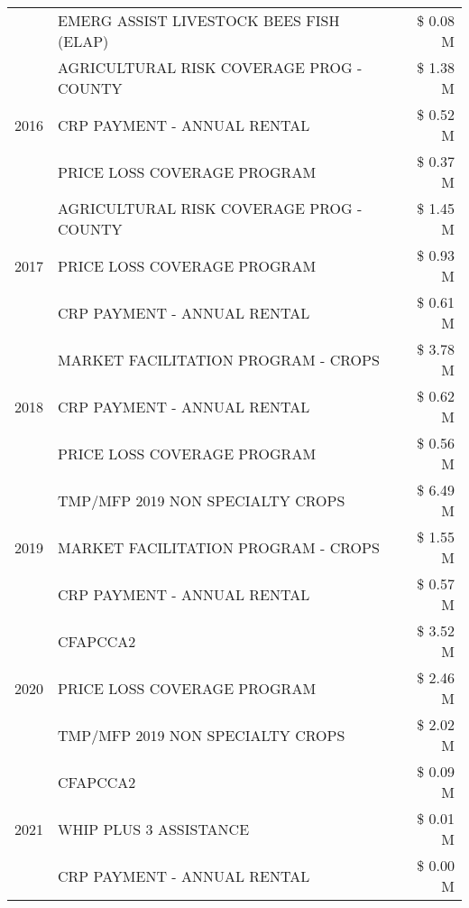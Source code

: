 \begin{tabular}{llr}
 & EMERG ASSIST LIVESTOCK BEES FISH (ELAP) & \$ 0.08 M \\
\cline{1-3}
\multirow[t]{3}{*}{2016} & AGRICULTURAL RISK COVERAGE PROG - COUNTY & \$ 1.38 M \\
 & CRP PAYMENT - ANNUAL RENTAL & \$ 0.52 M \\
 & PRICE LOSS COVERAGE PROGRAM & \$ 0.37 M \\
\cline{1-3}
\multirow[t]{3}{*}{2017} & AGRICULTURAL RISK COVERAGE PROG - COUNTY & \$ 1.45 M \\
 & PRICE LOSS COVERAGE PROGRAM & \$ 0.93 M \\
 & CRP PAYMENT - ANNUAL RENTAL & \$ 0.61 M \\
\cline{1-3}
\multirow[t]{3}{*}{2018} & MARKET FACILITATION PROGRAM - CROPS & \$ 3.78 M \\
 & CRP PAYMENT - ANNUAL RENTAL & \$ 0.62 M \\
 & PRICE LOSS COVERAGE PROGRAM & \$ 0.56 M \\
\cline{1-3}
\multirow[t]{3}{*}{2019} & TMP/MFP 2019 NON SPECIALTY CROPS & \$ 6.49 M \\
 & MARKET FACILITATION PROGRAM - CROPS & \$ 1.55 M \\
 & CRP PAYMENT - ANNUAL RENTAL & \$ 0.57 M \\
\cline{1-3}
\multirow[t]{3}{*}{2020} & CFAPCCA2 & \$ 3.52 M \\
 & PRICE LOSS COVERAGE PROGRAM & \$ 2.46 M \\
 & TMP/MFP 2019 NON SPECIALTY CROPS & \$ 2.02 M \\
\cline{1-3}
\multirow[t]{3}{*}{2021} & CFAPCCA2 & \$ 0.09 M \\
 & WHIP PLUS 3 ASSISTANCE & \$ 0.01 M \\
 & CRP PAYMENT - ANNUAL RENTAL & \$ 0.00 M \\
\cline{1-3}
\bottomrule
\end{tabular}
